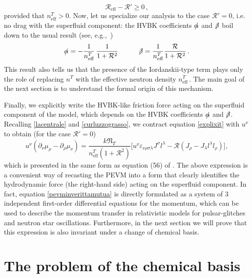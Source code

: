 \documentclass[preprints,article,accept,moreauthors,pdftex]{mdpi}
\newcommand{\spc}{\quad \quad \quad}
\begin{document}
\begin{equation}
\mathcal{R}_{\text{eff}} -\mathcal{R}' \geq 0 \, ,
\end{equation}
provided that $n^T_{\text{eff}}>0$.
Now, let us specialize our analysis to the case $\mathcal{R}'=0$, i.e. no drag with the superfluid component: the HVBK coefficients $\slashed{\alpha}$ and $\slashed{\beta}$ boil down to the usual result (see, e.g.,~\cite{andersson_sidery_2006,chamel_review_crust,haskellsedrakian2017,GusakovHVBK,GavassinoGeometria,antonelli2020MNRAS})
\begin{equation}
\slashed{\alpha} =-\dfrac{1}{n^T_{\text{eff}}} \, \dfrac{1 }{1+ \mathcal{R}^2}  \spc \slashed{\beta} = \dfrac{1}{n^T_{\text{eff}}} \dfrac{ \mathcal{R}}{1+ \mathcal{R}^2} \, .
\end{equation}
This result also tells us that the presence of the Iordanskii-type term plays only the role of replacing $n^T$ with the effective neutron density $n^T_{\text{eff}}\,$.  The main goal of the next section is to understand the formal origin of this mechanism.


Finally, we explicitly write the HVBK-like friction force acting on the superfluid component of the model, which depends on the HVBK coefficients $\slashed{\alpha}$ and $\slashed{\beta}$.
Recalling \eqref{lacentrale} and \eqref{curluzzograsso}, we contract equation \eqref{explixit} with $u^\nu$ to obtain (for the case $\mathcal{R}'=0$)
\begin{equation}\label{pevminverittamutua}
    u^\nu (\partial_\nu \mu_\rho - \partial_\rho \mu_\nu) = \dfrac{k \mathfrak{N}_T}{n_{\text{eff}}^T (1+\mathcal{R}^2)} \bigg[ u^\nu \varepsilon_{\nu \rho \sigma \lambda} J^\sigma l^\lambda - \mathcal{R}(J_\rho - J_\lambda l^\lambda l_\rho) \bigg],
\end{equation}
which is presented in the same form as equation (56) of \citet{GusakovHVBK}. 
The above expression is a convenient way of recasting the PEVM into a form that clearly identifies the hydrodynamic force (the right-hand side) acting on the superfluid component. In fact, equation \eqref{pevminverittamutua} is directly formulated as a system of 3 independent first-order differential equations for the momentum, which can be used to describe the momentum transfer in relativistic models for pulsar-glitches and neutron star oscillations. Furthermore, in the next section we will prove that this expression is also invariant under a change of chemical basis.

\section{The problem of the chemical basis}
\label{sezione4}
\end{document}

